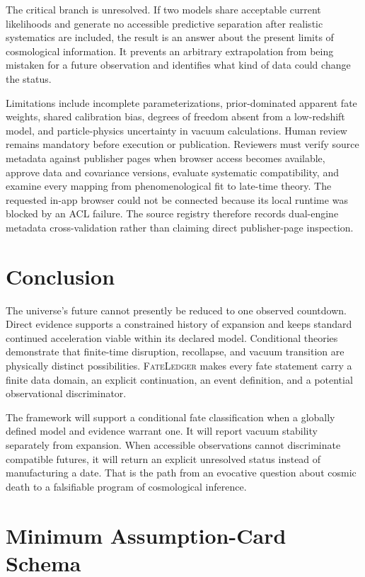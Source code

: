 \documentclass[conference]{IEEEtran}
\newcommand{\fateledger}{\textsc{FateLedger}}
\begin{document}
The critical branch is unresolved. If two models share acceptable current likelihoods and generate no accessible predictive separation after realistic systematics are included, the result is an answer about the present limits of cosmological information. It prevents an arbitrary extrapolation from being mistaken for a future observation and identifies what kind of data could change the status.

Limitations include incomplete parameterizations, prior-dominated apparent fate weights, shared calibration bias, degrees of freedom absent from a low-redshift model, and particle-physics uncertainty in vacuum calculations. Human review remains mandatory before execution or publication. Reviewers must verify source metadata against publisher pages when browser access becomes available, approve data and covariance versions, evaluate systematic compatibility, and examine every mapping from phenomenological fit to late-time theory. The requested in-app browser could not be connected because its local runtime was blocked by an ACL failure. The source registry therefore records dual-engine metadata cross-validation rather than claiming direct publisher-page inspection.

\section{Conclusion}

The universe's future cannot presently be reduced to one observed countdown. Direct evidence supports a constrained history of expansion and keeps standard continued acceleration viable within its declared model. Conditional theories demonstrate that finite-time disruption, recollapse, and vacuum transition are physically distinct possibilities. \fateledger{} makes every fate statement carry a finite data domain, an explicit continuation, an event definition, and a potential observational discriminator.

The framework will support a conditional fate classification when a globally defined model and evidence warrant one. It will report vacuum stability separately from expansion. When accessible observations cannot discriminate compatible futures, it will return an explicit unresolved status instead of manufacturing a date. That is the path from an evocative question about cosmic death to a falsifiable program of cosmological inference.

\appendices
\section{Minimum Assumption-Card Schema}
\end{document}
